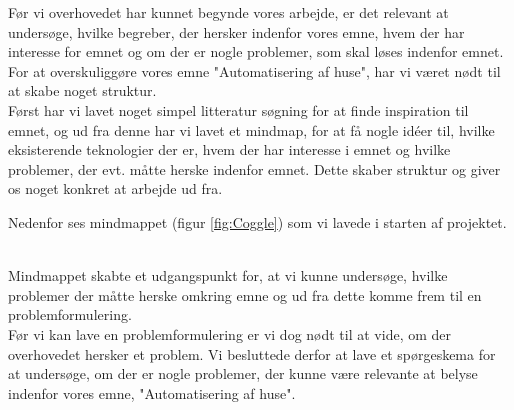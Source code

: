 Før vi overhovedet har kunnet begynde vores arbejde, er det relevant at undersøge, hvilke begreber, der hersker indenfor vores emne, hvem der har interesse for emnet og om der er nogle problemer, som skal løses indenfor emnet.\\
For at overskuliggøre vores emne "Automatisering af huse", har vi været nødt til at skabe noget struktur. \\

Først har vi lavet noget simpel litteratur søgning for at finde inspiration til emnet, og ud fra denne har vi lavet et mindmap, for at få nogle idéer til, hvilke eksisterende teknologier der er, hvem der har interesse i emnet og hvilke problemer, der evt. måtte herske indenfor emnet. Dette skaber struktur og giver os noget konkret at arbejde ud fra.

Nedenfor ses mindmappet (figur \ref{fig:Coggle}) som vi lavede i starten af projektet. \\\\

Mindmappet skabte et udgangspunkt for, at vi kunne undersøge, hvilke problemer der måtte herske omkring emne og ud fra dette komme frem til en problemformulering. \\Før vi kan lave en problemformulering er vi dog nødt til at vide, om der overhovedet hersker et problem. Vi besluttede derfor at lave et spørgeskema for at undersøge, om der er nogle problemer, der kunne være relevante at belyse indenfor vores emne, "Automatisering af huse".\\